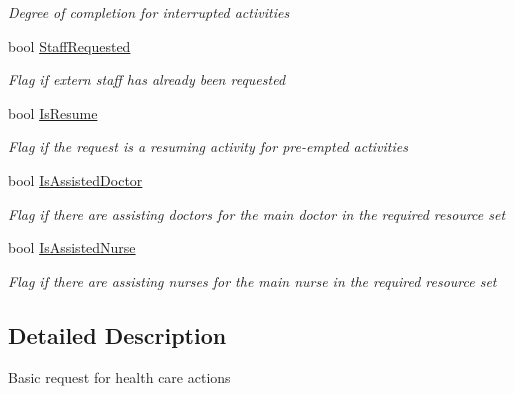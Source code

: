 \begin{DoxyCompactItemize}
\begin{DoxyCompactList}\small\item\em Degree of completion for interrupted activities \end{DoxyCompactList}\item 
bool \hyperlink{class_general_health_care_elements_1_1_activities_1_1_request_health_care_action_a596591434caa3c00595cd8dc6440c919}{Staff\+Requested}
\begin{DoxyCompactList}\small\item\em Flag if extern staff has already been requested \end{DoxyCompactList}\item 
bool \hyperlink{class_general_health_care_elements_1_1_activities_1_1_request_health_care_action_a223b90949b245905a50987038c05f454}{Is\+Resume}
\begin{DoxyCompactList}\small\item\em Flag if the request is a resuming activity for pre-\/empted activities \end{DoxyCompactList}\item 
bool \hyperlink{class_general_health_care_elements_1_1_activities_1_1_request_health_care_action_a5eca2ba4e69c62dedbbb71aa1989e2b1}{Is\+Assisted\+Doctor}
\begin{DoxyCompactList}\small\item\em Flag if there are assisting doctors for the main doctor in the required resource set \end{DoxyCompactList}\item 
bool \hyperlink{class_general_health_care_elements_1_1_activities_1_1_request_health_care_action_ab4877c990e9a34766d623a08579d76f5}{Is\+Assisted\+Nurse}
\begin{DoxyCompactList}\small\item\em Flag if there are assisting nurses for the main nurse in the required resource set \end{DoxyCompactList}\end{DoxyCompactItemize}


\subsection{Detailed Description}
Basic request for health care actions 


